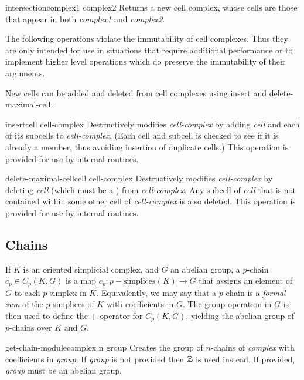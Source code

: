 \begin{functiondef}{intersection}{complex1 complex2}
Returns a new cell complex, whose cells are those that appear in both
{\em complex1} and {\em complex2}.
\end{functiondef}
  
The following operations violate the immutability of cell complexes.
Thus they are only intended for use in situations that require
additional performance or to implement higher level operations which
do preserve the immutability of their arguments.
  
New cells can be added and deleted from cell complexes using {\sf
insert} and {\sf delete-maximal-cell}.
  
\begin{methoddef}{insert}{cell cell-complex}
Destructively modifies {\em cell-complex} by adding {\em cell} and
each of its subcells to {\em cell-complex}.  (Each cell and subcell is
checked to see if it is already a member, thus avoiding insertion of
duplicate cells.)  This operation is provided for use by internal
routines.
\end{methoddef} 
 
\begin{methoddef}{delete-maximal-cell}{cell cell-complex}
Destructively modifies {\em cell-complex} by deleting {\em cell}
(which must be a ) from {\em cell-complex}.  Any
subcell of {\em cell} that is not contained within some other cell of
{\em cell-complex} is also deleted.  This operation is provided for
use by internal routines.
\end{methoddef}


\subsection{Chains}
\label{Chains:Sec}
  
If $K$ is an oriented simplicial complex, and $G$ an abelian group, a
$p$-chain $c_p \in C_p(K,G)$ is a map $c_p:p-\mbox{simplices}(K)
\rightarrow G$ that assigns an element of $G$ to each $p$-simplex in
$K$.  Equivalently, we may say that a $p$-chain is a {\it formal sum}
of the $p$-simplices of $K$ with coefficients in $G$.  The group
operation in $G$ is then used to define the $+$ operator for
$C_p(K,G)$, yielding the abelian group of $p$-chains over $K$ and $G$.



\begin{functiondef}{get-chain-module}{complex n \optional group}
Creates the group of $n$-chains of {\em complex} with coefficients in
{\em group\/}.  If {\em group} is not provided then ${\Bbb Z}$ is used
instead.  If provided, {\em group} must be an abelian group.
\end{functiondef}

